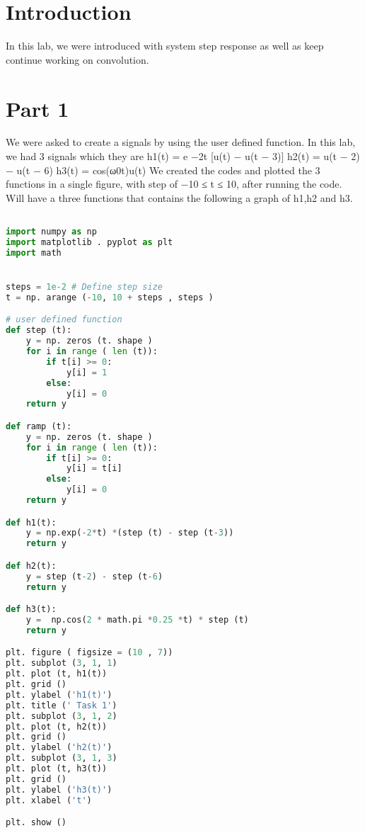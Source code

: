 \documentclass[12pt]{report}
\begin{document}
\section{Introduction}
 

In this lab, we were introduced with system step response as well as keep continue working on convolution.




\section{Part 1}

We were asked to create a signals by using the user defined function. In this lab, we had 3 signals which they are
h1(t) = e −2t [u(t) − u(t − 3)] 
h2(t) = u(t − 2) − u(t − 6) 
h3(t) = cos(ω0t)u(t)
We created the codes and plotted the 3 functions in a single figure, with step of −10 ≤ t ≤ 10, after running the code. Will have a three functions that contains the following a graph of h1,h2 and h3.





\begin{lstlisting}[language=Python]

import numpy as np
import matplotlib . pyplot as plt
import math


steps = 1e-2 # Define step size
t = np. arange (-10, 10 + steps , steps ) 

# user defined function
def step (t): 
    y = np. zeros (t. shape ) 
    for i in range ( len (t)): 
        if t[i] >= 0:  
            y[i] = 1
        else:
            y[i] = 0
    return y 

def ramp (t): 
    y = np. zeros (t. shape ) 
    for i in range ( len (t)): 
        if t[i] >= 0:  
            y[i] = t[i]
        else:
            y[i] = 0
    return y 

def h1(t):
    y = np.exp(-2*t) *(step (t) - step (t-3))
    return y

def h2(t):
    y = step (t-2) - step (t-6)
    return y

def h3(t):
    y =  np.cos(2 * math.pi *0.25 *t) * step (t)
    return y

plt. figure ( figsize = (10 , 7))
plt. subplot (3, 1, 1)
plt. plot (t, h1(t))
plt. grid ()
plt. ylabel ('h1(t)')
plt. title (' Task 1')
plt. subplot (3, 1, 2)
plt. plot (t, h2(t))
plt. grid ()
plt. ylabel ('h2(t)')
plt. subplot (3, 1, 3)
plt. plot (t, h3(t))
plt. grid ()
plt. ylabel ('h3(t)')
plt. xlabel ('t')

plt. show ()




\end{lstlisting}
\end{document}
